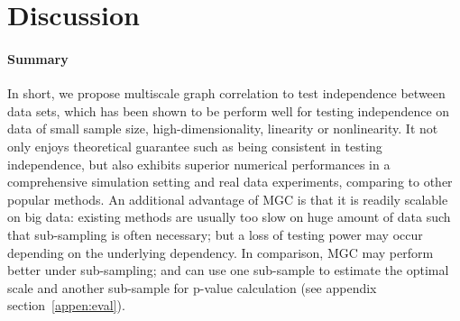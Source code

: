 \documentclass[11pt]{article}
\newcommand{\jv}[1]{{\color{red}{#1}}}
\newcommand{\cs}[1]{{\color{blue}{#1}}}
\begin{document}
\jv{let's move the table to the appendix, and add just a jittered scatter plot of MGC false positive rate, to include in the other real data figure?}
\cs{done; let me know if you want a better looking scatter plot}
\jv{i do :) can you label the x-axis with the name of the dataset or something? and add a dashed line at p=0.05 for the y-axis.  and make the y scale from 0 to 1 perhaps?}
\cs{Tried again! I deleted the long table in appendix, for now; as the plot and the mean/std are informative enough, I think. Also note that only mcorr and MGC are re-computed for the brain vs noise simulation; others will be updated later.}

\section{Discussion}
\label{conclu}

\paragraph{Summary}
In short, we propose multiscale graph correlation to test independence between data sets, which has been shown to be perform well for testing independence on data of small sample size, high-dimensionality, linearity or nonlinearity. It not only enjoys theoretical guarantee such as being consistent in testing independence, but also exhibits superior numerical performances in a comprehensive simulation setting and real data experiments, comparing to other popular methods. An additional advantage of MGC is that it is readily scalable on big data: existing methods are usually too slow on huge amount of data such that sub-sampling is often necessary; but a loss of testing power may occur depending on the underlying dependency. In comparison, MGC may perform better under sub-sampling; and can use one sub-sample to estimate the optimal scale and another sub-sample for p-value calculation (see appendix section~\ref{appen:eval}).

\end{document}

